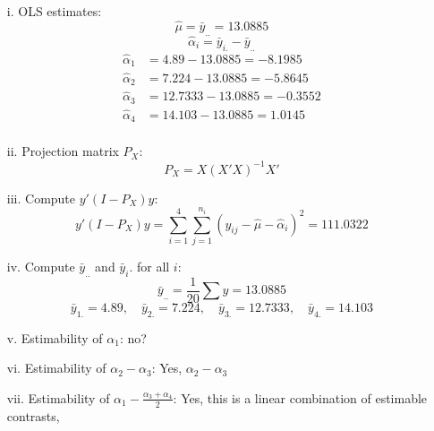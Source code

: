 \documentclass[10pt, oneside]{article}
\begin{document}
\begin{itemize}
\begin{itemize}
		\item[i.] OLS estimates:
    \[
      \hat{\mu} = \bar{y}_{..} = 13.0885
    \]
    \[
      \hat{\alpha}_i = \bar{y}_{i.} - \bar{y}_{..}
    \]
    \[
    \begin{aligned}
      \hat{\alpha}_1 &= 4.89 - 13.0885 = -8.1985 \\
      \hat{\alpha}_2 &= 7.224 - 13.0885 = -5.8645 \\
      \hat{\alpha}_3 &= 12.7333 - 13.0885 = -0.3552 \\
      \hat{\alpha}_4 &= 14.103 - 13.0885 = 1.0145 \\
    \end{aligned}
    \]		
  \item[ii.] Projection matrix $P_X$:
        \[
      P_X = X (X'X)^{-1} X'
    \]
		\item[iii.] Compute $y'(I - P_X)y$:
          \[
      y'(I - P_X)y = \sum_{i=1}^4 \sum_{j=1}^{n_i} (y_{ij} - \hat{\mu} - \hat{\alpha}_i)^2 = 111.0322
    \]
		\item[iv.] Compute $\bar{y}_{..}$ and $\bar{y}_i.$ for all $i$:
          \[
    \bar{y}_{..} = \frac{1}{20} \sum y = 13.0885
    \]
    \[
    \bar{y}_{1.} = 4.89, \quad \bar{y}_{2.} = 7.224, \quad \bar{y}_{3.} = 12.7333, \quad \bar{y}_{4.} = 14.103
    \]
		\item[v.] Estimability of $\alpha_1$:
no?
		\item[vi.] Estimability of $\alpha_2 - \alpha_3$:
      Yes, \(\alpha_2 - \alpha_3\)
		\item[vii.] Estimability of $\alpha_1 - \frac{\alpha_3 + \alpha_4}{2}$:
      Yes, this is a linear combination of estimable contrasts,
	\end{itemize}
\end{itemize}
\end{document}
